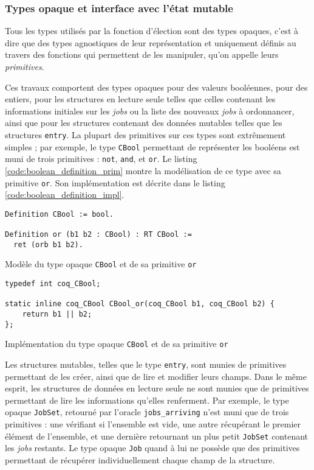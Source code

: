 	\subsubsection{Types opaque et interface avec l'état mutable}

	Tous les types utilisés par la fonction d'élection sont des types opaques, c'est à dire que des types agnostiques de leur représentation et uniquement définis au travers des fonctions qui permettent de les manipuler, qu'on appelle leurs \emph{primitives}.

	Ces travaux comportent des types opaques pour des valeurs booléennes, pour des entiers, pour les structures en lecture seule telles que celles contenant les informations initiales sur les \emph{jobs} ou la liste des nouveaux \emph{jobs} à ordonnancer, ainsi que pour les structures contenant des données mutables telles que les structures \texttt{entry}. La plupart des primitives sur ces types sont extrêmement simples ; par exemple, le type \texttt{CBool} permettant de représenter les booléens est muni de trois primitives : \texttt{not}, \texttt{and}, et \texttt{or}. Le listing \ref{code:boolean_definition_prim} montre la modélisation de ce type avec sa primitive \texttt{or}. Son implémentation est décrite dans le listing \ref{code:boolean_definition_impl}.

	\begin{listing}[!ht]
	\begin{verbatim}
Definition CBool := bool.

Definition or (b1 b2 : CBool) : RT CBool :=
  ret (orb b1 b2).
	\end{verbatim}
	\caption{Modèle du type opaque \texttt{CBool} et de sa primitive \texttt{or}}
	\label{code:boolean_definition_prim}
	\end{listing}

	\begin{listing}[!ht]
	\begin{verbatim}
typedef int coq_CBool;

static inline coq_CBool CBool_or(coq_CBool b1, coq_CBool b2) {
    return b1 || b2;
};
	\end{verbatim}
	\caption{Implémentation du type opaque \texttt{CBool} et de sa primitive \texttt{or}}
	\label{code:boolean_definition_impl}
	\end{listing}

	Les structures mutables, telles que le type \texttt{entry}, sont munies de primitives permettant de les créer, ainsi que de lire et modifier leurs champs. Dans le même esprit, les structures de données en lecture seule ne sont munies que de primitives permettant de lire les informations qu'elles renferment. Par exemple, le type opaque \texttt{JobSet}, retourné par l'oracle \texttt{jobs\_arriving} n'est muni que de trois primitives : une vérifiant si l'ensemble est vide, une autre récupérant le premier élément de l'ensemble, et une dernière retournant un plus petit \texttt{JobSet} contenant les \emph{jobs} restants. Le type opaque \texttt{Job} quand à lui ne possède que des primitives permettant de récupérer individuellement chaque champ de la structure.
	
